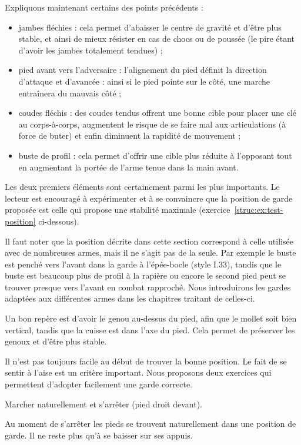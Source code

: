 \noindent
Expliquons maintenant certains des points précédents :
\begin{itemize}
	\item jambes fléchies : cela permet d'abaisser le centre de gravité et d'être plus stable, et ainsi de mieux résister en cas de chocs ou de poussée (le pire étant d'avoir les jambes totalement tendues) ;
	
	\item pied avant vers l'adversaire : l'alignement du pied définit la direction d'attaque et d'avancée : ainsi si le pied pointe sur le côté, une marche entraînera du mauvais côté ;
	
	\item coudes fléchis : des coudes tendus offrent une bonne cible pour placer une clé au corps-à-corps, augmentent le risque de se faire mal aux articulations (à force de buter) et enfin diminuent la rapidité de mouvement ;
	
	\item buste de profil : cela permet d'offrir une cible plus réduite à l'opposant tout en augmentant la portée de l'arme tenue dans la main avant.
\end{itemize}
Les deux premiers éléments sont certainement parmi les plus importants.
Le lecteur est encouragé à expérimenter et à se convaincre que la position de garde proposée est celle qui propose une stabilité maximale (exercice~\ref{struc:ex:test-position} ci-dessous).

Il faut noter que la position décrite dans cette section correspond à celle utilisée avec de nombreuses armes, mais il ne s'agit pas de la seule.
Par exemple le buste est penché vers l'avant dans la garde à l'épée-bocle (style I.33), tandis que le buste est beaucoup plus de profil à la rapière ou encore le second pied peut se trouver presque vers l'avant en combat rapproché.
Nous introduirons les gardes adaptées aux différentes armes dans les chapitres traitant de celles-ci.

Un bon repère est d'avoir le genou au-dessus du pied, afin que le mollet soit bien vertical, tandis que la cuisse est dans l'axe du pied.
Cela permet de préserver les genoux et d'être plus stable.

Il n'est pas toujours facile au début de trouver la bonne position.
Le fait de se sentir à l'aise est un critère important.
Nous proposons deux exercices qui permettent d'adopter facilement une garde correcte.


\begin{exercice}

Marcher naturellement et s'arrêter (pied droit devant).

Au moment de s'arrêter les pieds se trouvent naturellement dans une position de garde.
Il ne reste plus qu'à se baisser sur ses appuis.


\end{exercice}



